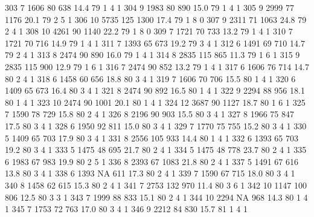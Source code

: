 \documentclass{article}
\begin{document}
\begin{Schunk}
\begin{Soutput}
303       7  1606  80  638 14.4  79      1       4        1
304       9  1983  80  890 15.0  79      1       4        1
305       9  2999  77 1176 20.1  79      2       5        1
306      10  5735 125 1300 17.4  79      1       8        0
307       9  2311  71 1063 24.8  79      2       4        1
308      10  4261  90 1140 22.2  79      1       8        0
309       7  1721  70  733 13.2  79      1       4        1
310       7  1721  70  716 14.9  79      1       4        1
311       7  1393  65  673 19.2  79      3       4        1
312       6  1491  69  710 14.7  79      2       4        1
313       8  2474  90  890 16.0  79      1       4        1
314       8  2835 115  865 11.3  79      1       6        1
315       9  2835 115  900 12.9  79      1       6        1
316       7  2474  90  852 13.2  79      1       4        1
317       6  1606  76  714 14.7  80      2       4        1
318       6  1458  60  656 18.8  80      3       4        1
319       7  1606  70  706 15.5  80      1       4        1
320       6  1409  65  673 16.4  80      3       4        1
321       8  2474  90  892 16.5  80      1       4        1
322       9  2294  88  956 18.1  80      1       4        1
323      10  2474  90 1001 20.1  80      1       4        1
324      12  3687  90 1127 18.7  80      1       6        1
325       7  1590  78  729 15.8  80      2       4        1
326       8  2196  90  903 15.5  80      3       4        1
327       8  1966  75  847 17.5  80      3       4        1
328       6  1950  92  811 15.0  80      3       4        1
329       7  1770  75  755 15.2  80      3       4        1
330       5  1409  65  703 17.9  80      3       4        1
331       8  2556 105  933 14.4  80      1       4        1
332       6  1393  65  703 19.2  80      3       4        1
333       5  1475  48  695 21.7  80      2       4        1
334       5  1475  48  778 23.7  80      2       4        1
335       6  1983  67  983 19.9  80      2       5        1
336       8  2393  67 1083 21.8  80      2       4        1
337       5  1491  67  616 13.8  80      3       4        1
338       6  1393  NA  611 17.3  80      2       4        1
339       7  1590  67  715 18.0  80      3       4        1
340       8  1458  62  615 15.3  80      2       4        1
341       7  2753 132  970 11.4  80      3       6        1
342      10  1147 100  806 12.5  80      3       3        1
343       7  1999  88  833 15.1  80      2       4        1
344      10  2294  NA  968 14.3  80      1       4        1
345       7  1753  72  763 17.0  80      3       4        1
346       9  2212  84  830 15.7  81      1       4        1

\end{Soutput}
\end{Schunk}
\end{document}

